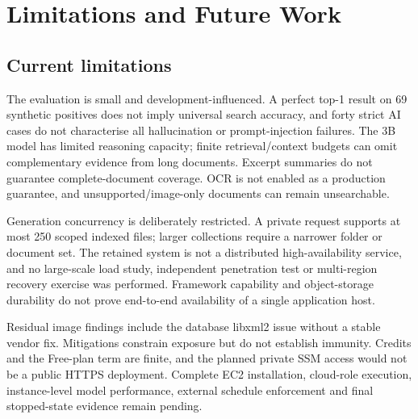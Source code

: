 \documentclass[11pt,a4paper,oneside]{report}
\begin{document}
\chapter{Limitations and Future Work}
\section{Current limitations}
The evaluation is small and development-influenced. A perfect top-1 result on 69 synthetic positives does not imply universal search accuracy, and forty strict AI cases do not characterise all hallucination or prompt-injection failures. The 3B model has limited reasoning capacity; finite retrieval/context budgets can omit complementary evidence from long documents. Excerpt summaries do not guarantee complete-document coverage. OCR is not enabled as a production guarantee, and unsupported/image-only documents can remain unsearchable.

Generation concurrency is deliberately restricted. A private request supports at most 250 scoped indexed files; larger collections require a narrower folder or document set. The retained system is not a distributed high-availability service, and no large-scale load study, independent penetration test or multi-region recovery exercise was performed. Framework capability and object-storage durability do not prove end-to-end availability of a single application host.

Residual image findings include the database libxml2 issue without a stable vendor fix. Mitigations constrain exposure but do not establish immunity. Credits and the Free-plan term are finite, and the planned private SSM access would not be a public HTTPS deployment. Complete EC2 installation, cloud-role execution, instance-level model performance, external schedule enforcement and final stopped-state evidence remain pending.
\end{document}
